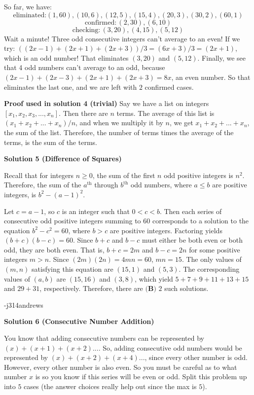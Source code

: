 \begin{enumerate}
 So far, we have: 
 \[\text{eliminated:} (1,60), (10,6), (12,5), (15,4), (20,3), (30,2), (60,1)\]
 \[\text{confirmed}: (2,30), (6,10)\]
 \[\text{checking}:(3,20), (4,15), (5,12)\]Wait a minute! Three odd consecutive integers can't average to an even! If we try: $((2x-1) + (2x+1) + (2x+3))/3 = (6x + 3)/3 = (2x+1)$, which is an odd number! That eliminates $(3,20)$ and $(5,12)$. Finally, we see that 4 odd numbers can't average to an odd, because $(2x-1) + (2x-3) + (2x+1) + (2x+3) = 8x$, an even number. So that eliminates the last one, and we are left with $2$ confirmed cases.

 \textbf{Proof used in solution 4 (trivial)} Say we have a list on integers $[x_1, x_2, x_3, ... , x_n]$. Then there are $n$ terms. The average of this list is $(x_1 + x_2 + ... + x_n)/n$, and when we multiply it by $n$, we get $x_1 + x_2 + ... + x_n$, the sum of the list. Therefore, the number of terms times the average of the terms, is the sum of the terms.

 


 



\textbf{Solution 5 (Difference of Squares)}

Recall that for integers $n \geq 0$, the sum of the first $n$ odd positive integers is $n^2$.  Therefore, the sum of the $a^{\textrm{th}}$ through $b^{\textrm{th}}$ odd numbers, where $a \leq b$ are positive integers, is $b^2-(a-1)^2$.

 Let $c = a-1$, so $c$ is an integer such that $0 < c < b$.  Then each series of consecutive odd positive integers summing to $60$ corresponds to a solution to the equation $b^2 - c^2 = 60$, where $b > c$ are positive integers.  Factoring yields $(b+c)(b-c) = 60$.  Since $b+c$ and $b-c$ must either be both even or both odd, they are both even.  That is, $b+c = 2m$ and $b-c = 2n$ for some  positive integers $m > n$.  Since $(2m)(2n) = 4mn = 60$, $mn = 15$.  The only values of $(m, n)$ satisfying this equation are $(15, 1)$ and $(5, 3)$.  The corresponding values of $(a, b)$ are $(15, 16)$ and $(3, 8)$, which yield $5 + 7 + 9 + 11 + 13 + 15$ and $29 + 31$, respectively.  Therefore, there are $\boxed{\textbf{(B) }2}$ such solutions.

 -j314andrews

 



\textbf{Solution 6 (Consecutive Number Addition)}

You know that adding consecutive numbers can be represented by $(x) + (x + 1) + (x + 2)...$. So, adding consecutive odd numbers would be represented by $(x) + (x + 2) + (x + 4)...$, since every other number is odd. However, every other number is also even. So you must be careful as to what number $x$ is so you know if this series will be even or odd. Split this problem up into $5$ cases (the answer choices really help out since the max is $5$). 


\end{enumerate}

